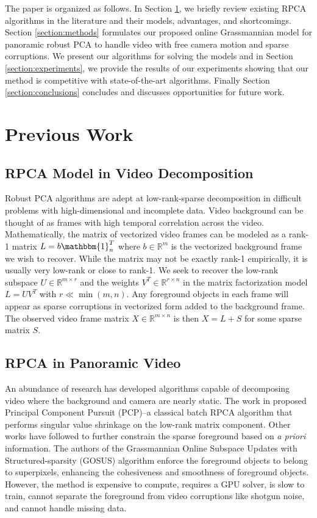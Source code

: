 \documentclass[10pt,twocolumn,letterpaper]{article}
\begin{document}
The paper is organized as follows. In Section \ref{section:lit_review}, we briefly review existing RPCA algorithms in the literature and their models, advantages, and shortcomings. Section \ref{section:methods} formulates our proposed online Grassmannian model for panoramic robust PCA to handle video with free camera motion and sparse corruptions. We present our algorithms for solving the models and in Section \ref{section:experiments}, we provide the results of our experiments showing that our method is competitive with state-of-the-art algorithms. Finally Section \ref{section:conclusions} concludes and discusses opportunities for future work. 

\section{Previous Work} \label{section:lit_review}

\subsection{RPCA Model in Video Decomposition}

Robust PCA algorithms are adept at low-rank-sparse decomposition in difficult problems with high-dimensional and incomplete data. Video background can be thought of as frames with high temporal correlation across the video. Mathematically, the matrix of vectorized video frames can be modeled as a rank-1 matrix $L = b \mathbbm{1}_n^T$ where $b \in \mathbb{R}^m$ is the vectorized background frame we wish to recover. While the matrix may not be exactly rank-1 empirically, it is usually very low-rank or close to rank-1. We seek to recover the low-rank subspace $U \in \mathbb{R}^{m \times r}$ and the weights $V^T \in \mathbb{R}^{r \times n}$ in the matrix factorization model $L = UV^T$ with $r \ll \min(m,n)$. Any foreground objects in each frame will appear as sparse corruptions in vectorized form added to the background frame. The observed video frame matrix $X \in \mathbb{R}^{m \times n}$ is then $X = L + S$ for some sparse matrix $S$.

\subsection{RPCA in Panoramic Video}

An abundance of research has developed algorithms capable of decomposing video where the background and camera are nearly static. The work in {\cite{candes}} proposed Principal Component Pursuit (PCP)--a classical batch RPCA algorithm that performs singular value shrinkage on the low-rank matrix component.  Other works have followed to further constrain the sparse foreground based on \textit{a priori} information. The authors of the Grassmannian Online Subspace Updates with Structured-sparsity (GOSUS) algorithm \cite{gosus} enforce the foreground objects to belong to superpixels, enhancing the cohesiveness and smoothness of foreground objects. However, the method is expensive to compute, requires a GPU solver, is slow to train, cannot separate the foreground from video corruptions like shotgun noise, and cannot handle missing data. 
\end{document}
